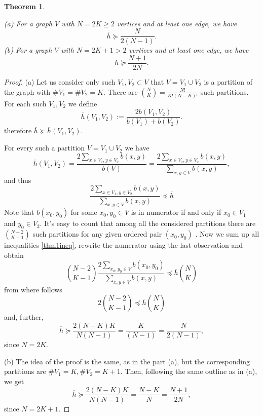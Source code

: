\documentclass[a4paper,12pt]{amsart}
\newtheorem{theorem}{Theorem}
\theoremstyle{definition}
\begin{document}
\begin{theorem}\label{MainThm1}

\textnormal {(a)} For a graph $V$ with $N=2K\ge 2$ vertices and at least one edge, we have
$$
\overline h \succeq \frac{N}{2(N-1)}.
$$
\textnormal {(b)}  For a graph $V$ with $N=2K+1>2$ vertices and at least one edge, we have
$$
\overline h \succeq \dfrac{N+1}{2N}.
$$
\end{theorem}

\begin{proof}
(a) Let us consider only such $V_1, V_2\subset V$  that $V=V_1\cup V_2$ is a partition of the graph with  $\#V_1=\# V_2=K$. There are ${N\choose K}=\frac{N!}{K!(N-K)!}$ such partitions.  For each such $V_1, V_2$ we define
$$
\overline h (V_1,V_2):=\frac{2b(V_1,V_2)}{b(V_1)+b(V_2)}.
$$
therefore $\overline h\succeq \overline h(V_1,V_2)$.

For every such a partition $V=V_1\cup V_2$ we have 
$$
\overline h(V_1,V_2)=\frac{2\sum_{x\in V_1,y\in V_2}b(x,y)}{b(V)}=\frac{2\sum_{x\in V_1,y\in V_2}b(x,y)}{\sum_{x,y\in V}b(x,y)},
$$
and thus
\begin{equation}\label{thm1ineq}
\frac{2\sum_{x\in V_1,y\in V_2}b(x,y)}{\sum_{x,y\in V}b(x,y)}\preceq \overline h
\end{equation}
Note that $b({x_0},y_0)$ for some $x_0,y_0\in V$ is in numerator if and only if ${x_0}\in V_1$ and ${y_0}\in V_2$. It's easy to count that among all the considered partitions
there are ${{N-2}\choose {K-1}}$ such partitions for any given ordered pair $(x_0,y_0)$ . 
Now we sum up all inequalities \eqref{thm1ineq}, rewrite the numerator using the last observation and obtain
$$
{{N-2}\choose {K-1}}\frac{2\sum_{x_0,y_0\in V}b(x_0,y_0)}{\sum_{x,y\in V}b(x,y)}\preceq\overline h {N\choose K}
$$
from where follows
$$
2{{N-2}\choose {K-1}}\preceq\overline h {N\choose K}
$$
and, further,
$$
\overline h \succeq \dfrac{2(N-K)K}{N(N-1)}=\dfrac{K}{(N-1)}=\dfrac{N}{2(N-1)},
$$
since $N=2K$.




(b) The idea of the proof is the same, as in the part (a), but the corresponding partitions are $\#V_1=K, \# V_2=K+1$. Then, following the same outline as in (a), we get
$$
\overline h \succeq \dfrac{2(N-K)K}{N(N-1)}=\dfrac{N-K}{N}=\dfrac{N+1}{2N},
$$
since $N=2K+1$.

\end{proof}
\end{document}
